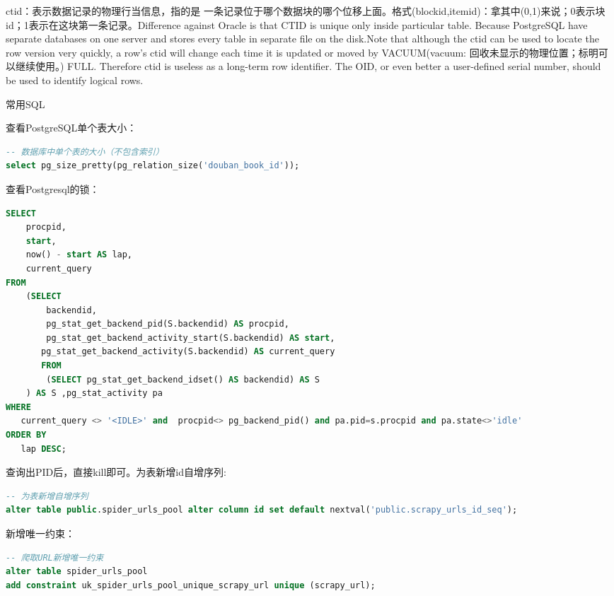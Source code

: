 \documentclass[8pt]{book}
\makeatletter
\numberwithin{dummy}{section}
\theoremstyle{ocrenumbox}
\theoremstyle{blacknumex}
\theoremstyle{blacknumbox}
\theoremstyle{ocrenum}
\renewcommand{\subsection}{\@startsection {subsection}{2}{\z@}
	{-3ex \@plus -0.1ex \@minus -.4ex}
	{0.5ex \@plus.2ex }
	{\normalfont\sffamily\bfseries}}
\makeatother
\begin{document}
ctid：表示数据记录的物理行当信息，指的是 一条记录位于哪个数据块的哪个位移上面。格式(blockid,itemid)：拿其中(0,1)来说；0表示块id；1表示在这块第一条记录。Difference against Oracle is that CTID is unique only inside particular table. Because PostgreSQL have separate databases on one server and stores every table in separate file on the disk.Note that although the ctid can be used to locate the row version very quickly, a row's ctid will change each time it is updated or moved by VACUUM(vacuum: 回收未显示的物理位置；标明可以继续使用。) FULL. Therefore ctid is useless as a long-term row identifier. The OID, or even better a user-defined serial number, should be used to identify logical rows.

\subsection{常用SQL}

查看PostgreSQL单个表大小：

\begin{lstlisting}[language=SQL]
-- 数据库中单个表的大小（不包含索引）
select pg_size_pretty(pg_relation_size('douban_book_id'));
\end{lstlisting}

查看Postgresql的锁：

\begin{lstlisting}[language=SQL]
SELECT   
    procpid,   
    start,   
    now() - start AS lap,   
    current_query   
FROM   
    (SELECT   
        backendid,   
        pg_stat_get_backend_pid(S.backendid) AS procpid,   
        pg_stat_get_backend_activity_start(S.backendid) AS start,   
       pg_stat_get_backend_activity(S.backendid) AS current_query   
       FROM   
        (SELECT pg_stat_get_backend_idset() AS backendid) AS S   
    ) AS S ,pg_stat_activity pa  
WHERE   
   current_query <> '<IDLE>' and  procpid<> pg_backend_pid() and pa.pid=s.procpid and pa.state<>'idle'  
ORDER BY   
   lap DESC;
\end{lstlisting}

查询出PID后，直接kill即可。为表新增id自增序列:

\begin{lstlisting}[language=SQL]
-- 为表新增自增序列
alter table public.spider_urls_pool alter column id set default nextval('public.scrapy_urls_id_seq');
\end{lstlisting}

新增唯一约束：

\begin{lstlisting}[language=SQL]
-- 爬取URL新增唯一约束
alter table spider_urls_pool 
add constraint uk_spider_urls_pool_unique_scrapy_url unique (scrapy_url);
\end{lstlisting}
\end{document}
